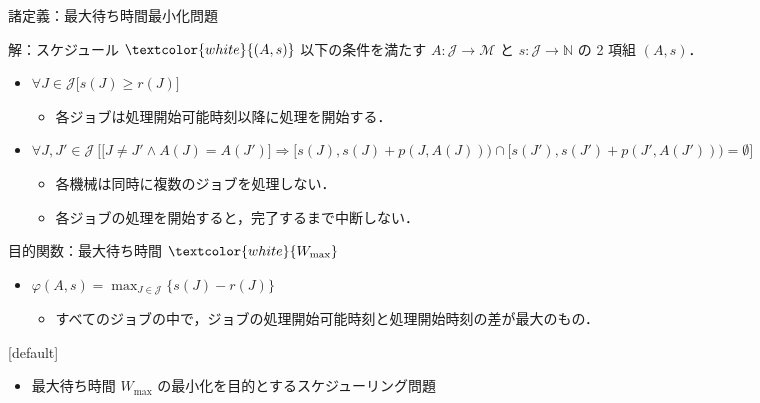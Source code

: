 \documentclass[dvipdfmx]{beamer}
\begin{document}
    \begin{frame}{諸定義：最大待ち時間最小化問題}
      \begin{block}{解：スケジュール $\textcolor{white}{(A,s)}$}
        以下の条件を満たす $A : \mathcal{J} \to \mathcal{M}$ と $s : \mathcal{J} \to \mathbb{N}$ の 2 項組 $(A,s)$．
        \begin{itemize}
          \item {$\forall J \in \mathcal{J}\big[s(J) \ge r(J) \big]$}
          \begin{itemize}
            \item {各ジョブは処理開始可能時刻以降に処理を開始する．}
          \end{itemize}
          \item {$\forall J, J' \in \mathcal{J}\ \Big[ \big[J\ne J' \land A(J) = A(J')\big] \Rightarrow [s(J), s(J)+p(J,A(J))) \cap[s(J'), s(J')+p(J', A(J'))) = \emptyset \Big]$}
          \begin{itemize}
            \item {各機械は同時に複数のジョブを処理しない．}
            \item {各ジョブの処理を開始すると，完了するまで中断しない．}
          \end{itemize}
        \end{itemize}
      \end{block}

      \begin{block}{目的関数：最大待ち時間 $\textcolor{white}{W_{\max}}$}
        \begin{itemize}
          \item $\varphi(A,s) = {\displaystyle \max_{J \in \mathcal{J}}\{s(J) - r(J)\}}$
          \begin{itemize}
            \item すべてのジョブの中で，ジョブの処理開始可能時刻と処理開始時刻の差が最大のもの．
          \end{itemize}
        \end{itemize}
      \end{block}

      [default]
      \begin{itemize}
        \item 最大待ち時間 $W_{\max}$ の最小化を目的とするスケジューリング問題
      \end{itemize}
    \end{frame}
\end{document}

